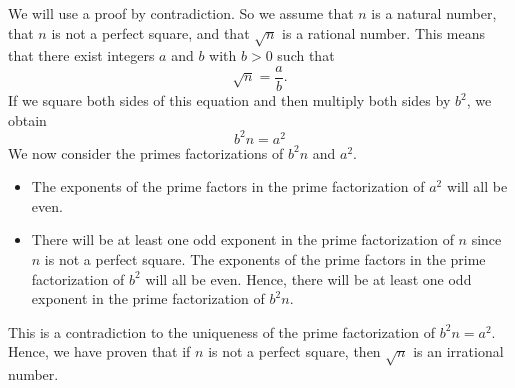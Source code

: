 \begin{enumerate}
\begin{enumerate}
\begin{myproof}
We will use a proof by contradiction.  So we assume that $n$ is a natural number, that $n$ is not a perfect square, and that $\sqrt{n}$ is a rational number.  This means that there exist integers $a$ and $b$ with $b > 0$ such that
\[
\sqrt{n} = \frac{a}{b}.
\]
If we square both sides of this equation and then multiply both sides by $b^2$, we obtain
\begin{equation}\label{contra}
b^2 n = a^2
\end{equation}
We now consider the primes factorizations of $b^2 n$ and $a^2$.  
\begin{itemize}
\item The exponents of the prime factors in the prime factorization of $a^2$ will all be even.
\item There will be at least one odd exponent in the prime factorization of $n$ since $n$ is not a perfect square.  The exponents of the prime factors in the prime factorization of $b^2$ will all be even.  Hence, there will be at least one odd exponent in the prime factorization of 
$b^2 n$.
\end{itemize}
This is a contradiction to the uniqueness of the prime factorization of $b^2 n = a^2$.  Hence, we have proven that if $n$ is not a perfect square, then $\sqrt{n}$ is an irrational number.
\end{myproof}

\end{enumerate}


\end{enumerate}

\hbreak
\endinput


